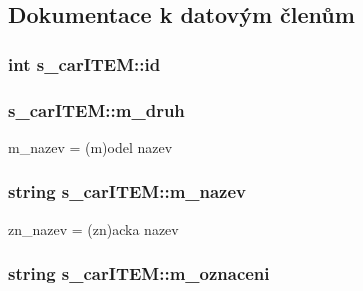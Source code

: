 \subsection{\-Dokumentace k datovým členům}
\hypertarget{structs__carITEM_ac3fb1808cd4c5d9db744b2342efebd01}{
\subsubsection[{id}]{\setlength{\rightskip}{0pt plus 5cm}int {\bf s\-\_\-car\-I\-T\-E\-M\-::id}}}
\label{d7/da8/structs__carITEM_ac3fb1808cd4c5d9db744b2342efebd01}
\hypertarget{structs__carITEM_a4173c03873679957370ee10781c99291}{
\subsubsection[{m\-\_\-druh}]{ {\bf s\-\_\-car\-I\-T\-E\-M\-::m\-\_\-druh}}}
\label{d7/da8/structs__carITEM_a4173c03873679957370ee10781c99291}


m\-\_\-nazev = (m)odel nazev 

\hypertarget{structs__carITEM_aad62e052d82d733a186d4dc5401da634}{
\subsubsection[{m\-\_\-nazev}]{\setlength{\rightskip}{0pt plus 5cm}string {\bf s\-\_\-car\-I\-T\-E\-M\-::m\-\_\-nazev}}}
\label{d7/da8/structs__carITEM_aad62e052d82d733a186d4dc5401da634}


zn\-\_\-nazev = (zn)acka nazev 

\hypertarget{structs__carITEM_a3fb9d29cae50d02de945bdac1b9e7af6}{
\subsubsection[{m\-\_\-oznaceni}]{\setlength{\rightskip}{0pt plus 5cm}string {\bf s\-\_\-car\-I\-T\-E\-M\-::m\-\_\-oznaceni}}}
\label{d7/da8/structs__carITEM_a3fb9d29cae50d02de945bdac1b9e7af6}



